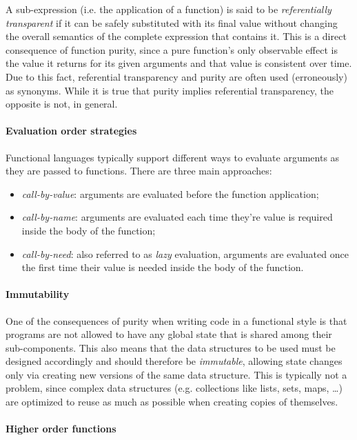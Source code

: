 A sub-expression (i.e. the application of a function) is said to be \textit{referentially transparent} if it can be safely substituted with its final value without changing the overall semantics of the complete expression that contains it.
%
This is a direct consequence of function purity, since a pure function's only observable effect is the value it returns for its given arguments and that value is consistent over time.
%
Due to this fact, referential transparency and purity are often used (erroneously) as synonyms.
%
While it is true that purity implies referential transparency, the opposite is not, in general.

\paragraph{Evaluation order strategies}

Functional languages typically support different ways to evaluate arguments as they are passed to functions.
%
There are three main approaches:
%
\begin{itemize}
    \item \textit{call-by-value}: arguments are evaluated before the function application;
    \item \textit{call-by-name}: arguments are evaluated each time they're value is required inside the body of the function;
    \item \textit{call-by-need}: also referred to as \textit{lazy} evaluation, arguments are evaluated once the first time their value is needed inside the body of the function.
\end{itemize}

\paragraph{Immutability}

One of the consequences of purity when writing code in a functional style is that programs are not allowed to have any global state that is shared among their sub-components.
%
This also means that the data structures to be used must be designed accordingly and should therefore be \textit{immutable}, allowing state changes only via creating new versions of the same data structure.
%
This is typically not a problem, since complex data structures (e.g. collections like lists, sets, maps, \dots) are optimized to reuse as much as possible when creating copies of themselves.

\paragraph{Higher order functions}

